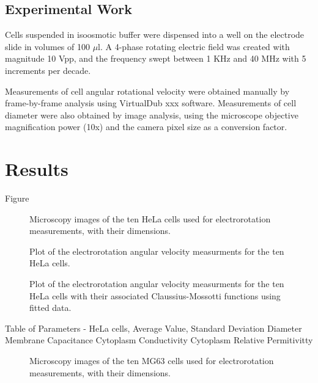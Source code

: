 \subsection{Experimental Work}

Cells suspended in isoosmotic buffer were dispensed into a well on the electrode slide in volumes of 100 $\mu$l. A 4-phase rotating electric field was created with magnitude 10 Vpp, and the frequency swept between 1 KHz and 40 MHz with 5 increments per decade.

Measurements of cell angular rotational velocity were obtained manually by frame-by-frame analysis using VirtualDub xxx software. Measurements of cell diameter were also obtained by image analysis, using the microscope objective magnification power (10x) and the camera pixel size as a conversion factor.

\section{Results}

Figure

\begin{figure}
	\centering
	\caption{Microscopy images of the ten HeLa cells used for electrorotation measurements, with their dimensions.}
	\label{fig:Cell_images_HeLa_ROT}
\end{figure}

\begin{figure}
	\centering
	\caption{Plot of the electrorotation angular velocity measurments for the ten HeLa cells.}
	\label{fig:HeLa_ROT_scatter plot}
\end{figure}

\begin{figure}
	\centering
	\caption{Plot of the electrorotation angular velocity measurments for the ten HeLa cells with their associated Claussius-Mossotti functions using fitted data.}
	\label{fig:HeLa_ROT_fits}
\end{figure}

Table of Parameters - HeLa cells, Average Value, Standard Deviation
Diameter
Membrane Capacitance
Cytoplasm Conductivity
Cytoplasm Relative Permitivitty

\begin{figure}
	\centering
	\caption{Microscopy images of the ten MG63 cells used for electrorotation measurements, with their dimensions.}
	\label{fig:Cell_images_MG63_ROT}
\end{figure}

